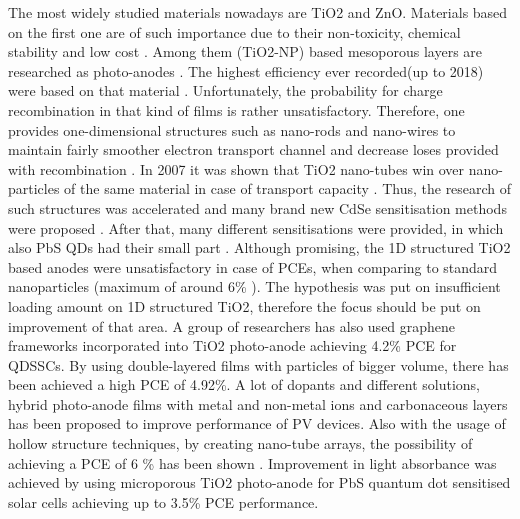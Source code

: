 \begin{enumerate}
The most widely studied materials nowadays are TiO2 and ZnO. Materials based on the first one are of such importance due to their non-toxicity, chemical stability and low cost \cite{I.Mora-Sero2014a} \cite{Tian2015} . Among them (TiO2-NP) based mesoporous layers are researched as photo-anodes \cite{I.Mora-Sero2014a}. The highest efficiency ever recorded(up to 2018) were based on that material \cite{Du2016} \cite{J.Du2017} . Unfortunately, the probability for charge recombination in that kind of films is rather unsatisfactory.  Therefore, one provides one-dimensional structures such as nano-rods and nano-wires to maintain fairly smoother electron transport channel and decrease loses provided with recombination \cite{Y.Liu2014} \cite{M.A.Manthrammel2015} . In 2007 it was shown that TiO2 nano-tubes win over nano-particles of the same material in case of transport capacity \cite{Kamat2009} \cite{Tvrdy2008}.  Thus, the research of such structures was accelerated and many brand new CdSe sensitisation methods were proposed \cite{A.Yamada2010} . After that, many different sensitisations were provided, in which also PbS QDs had their small part \cite{C.Shi2017} . Although promising, the 1D structured TiO2 based anodes were unsatisfactory in case of PCEs, when comparing to standard nanoparticles (maximum of around 6\%  ). The hypothesis was put on insufficient loading amount on 1D structured TiO2, therefore the focus should be put on improvement of that area. A group of researchers has also used graphene frameworks incorporated into TiO2 photo-anode achieving 4.2\% PCE for QDSSCs. \cite{XinMeng2014} By using double-layered films with particles of bigger volume, there has been achieved a high PCE of 4.92\%. A lot of dopants and different solutions, hybrid photo-anode films with metal and non-metal ions and carbonaceous layers has been proposed to improve performance of PV devices. Also with the usage of hollow structure techniques, by creating nano-tube arrays, the possibility of achieving a PCE of 6 \% has been shown \cite{MikhailArtemyev2019}. Improvement in light absorbance was achieved by using microporous TiO2 photo-anode for PbS quantum dot sensitised solar cells achieving up to 3.5\% PCE performance.


\end{enumerate}
